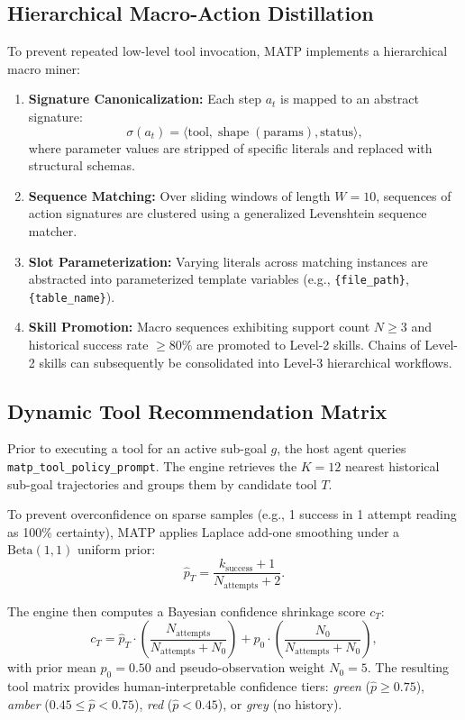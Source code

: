 \documentclass[10pt,journal,compsoc]{IEEEtran}
\begin{document}
\subsection{Hierarchical Macro-Action Distillation}
To prevent repeated low-level tool invocation, MATP implements a hierarchical macro miner:
\begin{enumerate}
    \item \textbf{Signature Canonicalization:} Each step $a_t$ is mapped to an abstract signature:
    \begin{equation}
    \sigma(a_t) = \langle \text{tool}, \operatorname{shape}(\text{params}), \text{status} \rangle,
    \end{equation}
    where parameter values are stripped of specific literals and replaced with structural schemas.
    \item \textbf{Sequence Matching:} Over sliding windows of length $W=10$, sequences of action signatures are clustered using a generalized Levenshtein sequence matcher.
    \item \textbf{Slot Parameterization:} Varying literals across matching instances are abstracted into parameterized template variables (e.g., \texttt{\{file\_path\}}, \texttt{\{table\_name\}}).
    \item \textbf{Skill Promotion:} Macro sequences exhibiting support count $N \ge 3$ and historical success rate $\ge 80\%$ are promoted to Level-2 skills. Chains of Level-2 skills can subsequently be consolidated into Level-3 hierarchical workflows.
\end{enumerate}

\subsection{Dynamic Tool Recommendation Matrix}
Prior to executing a tool for an active sub-goal $g$, the host agent queries \texttt{matp\_tool\_policy\_prompt}. The engine retrieves the $K=12$ nearest historical sub-goal trajectories and groups them by candidate tool $T$.

To prevent overconfidence on sparse samples (e.g., 1 success in 1 attempt reading as 100\% certainty), MATP applies Laplace add-one smoothing under a $\text{Beta}(1, 1)$ uniform prior:
\begin{equation}
\hat{p}_T = \frac{k_{\text{success}} + 1}{N_{\text{attempts}} + 2}.
\end{equation}

The engine then computes a Bayesian confidence shrinkage score $c_T$:
\begin{equation}
c_T = \hat{p}_T \cdot \left(\frac{N_{\text{attempts}}}{N_{\text{attempts}} + N_0}\right) + p_0 \cdot \left(\frac{N_0}{N_{\text{attempts}} + N_0}\right),
\end{equation}
with prior mean $p_0 = 0.50$ and pseudo-observation weight $N_0 = 5$. The resulting tool matrix provides human-interpretable confidence tiers: \textit{green} ($\hat{p} \ge 0.75$), \textit{amber} ($0.45 \le \hat{p} < 0.75$), \textit{red} ($\hat{p} < 0.45$), or \textit{grey} (no history).
\end{document}
